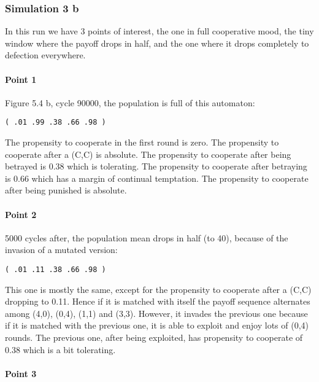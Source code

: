 \documentclass[12.5pt]{report}
\begin{document}
\subsubsection{Simulation 3 b}

In this run we have 3 points of interest, the one in full cooperative mood, the tiny window where the payoff drops in half, and the one where it drops completely to defection everywhere.\\

\paragraph{Point 1}
Figure 5.4 b, cycle 90000, the population is full of this automaton:

\begin{verbatim}
( .01 .99 .38 .66 .98 )
\end{verbatim}

The propensity to cooperate in the first round is zero. The propensity to cooperate after a (C,C) is absolute. The propensity to cooperate after being betrayed is 0.38 which is tolerating. The propensity to cooperate after betraying is 0.66 which has a margin of continual temptation. The propensity to cooperate after being punished is absolute.

\paragraph{Point 2}

5000 cycles after, the population mean drops in half (to 40), because of the invasion of a mutated version:

\begin{verbatim}
( .01 .11 .38 .66 .98 )
\end{verbatim}

This one is mostly the same, except for the propensity to cooperate after a (C,C) dropping to 0.11. Hence if it is matched with itself the payoff sequence alternates among (4,0), (0,4), (1,1) and (3,3). However, it invades the previous one because if it is matched with the previous one, it is able to exploit and enjoy lots of (0,4) rounds. The previous one, after being exploited, has propensity to cooperate of 0.38 which is a bit tolerating.

\paragraph{Point 3}
\end{document}
